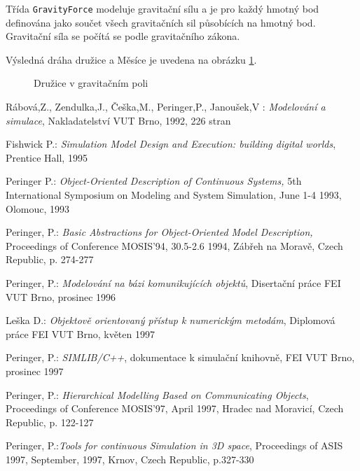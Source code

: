 \documentclass[a4paper]{article}
\begin{document}
Třída \verb|GravityForce| modeluje gravitační sílu a je pro každý hmotný bod
definována jako součet všech gravitačních sil působících na hmotný bod.
Gravitační síla se počítá se podle gravitačního zákona.

Výsledná dráha družice a Měsíce je uvedena na obrázku \ref{druzice}.

\begin{figure}[ht]
  \begin{center}
    \caption{Družice v gravitačním poli}
    \label{druzice}
  \end{center}
\end{figure}


\begin{thebibliography}{1}

Rábová,Z., Zendulka,J., Češka,M., Peringer,P., Janoušek,V :
{\it Modelování a simulace}, Nakladatelství VUT Brno, 1992, 226 stran

Fishwick P.: {\it Simulation Model Design and Execution: building digital
  worlds}, Prentice Hall, 1995

Peringer P.: {\it Object-Oriented Description of Continuous Systems,} 5th
  International Symposium on Modeling and System Simulation, June 1-4 1993,
  Olomouc, 1993

Peringer, P.: {\it Basic Abstractions for Object-Oriented Model
  Description,} Proceedings of Conference MOSIS'94, 30.5-2.6 1994,
  Zábřeh na  Moravě, Czech Republic, p. 274-277

Peringer, P.: {\it Modelování na bázi komunikujících objektů},
 Disertační práce FEI VUT Brno, prosinec 1996

Leška D.: {\it Objektově orientovaný přístup k numerickým metodám},
Diplomová práce FEI VUT Brno, květen 1997

Peringer, P.: {\it SIMLIB/C++},
dokumentace k simulační knihovně, FEI VUT Brno, prosinec 1997

Peringer, P.:{\it
  Hierarchical Modelling Based on Communicating Objects},
  Proceedings of Conference MOSIS'97, April 1997,
  Hradec nad Moravicí, Czech Republic, p. 122-127

Peringer, P.:{\it Tools for continuous Simulation in 3D space},
  Proceedings of ASIS 1997, September, 1997,
  Krnov, Czech Republic, p.327-330

\end{thebibliography}
\end{document}
